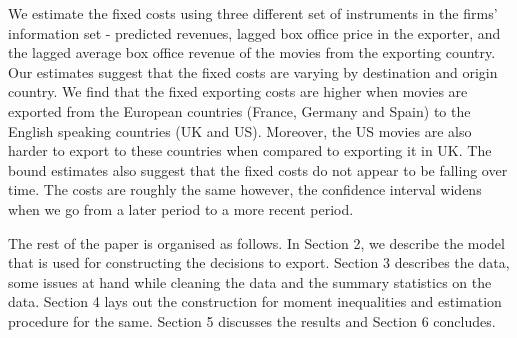 \documentclass[11pt, letterpaper]{article} \usepackage{amsmath}
\begin{document}
We estimate the fixed costs using three different set of instruments
in the firms' information set - predicted revenues, lagged box office
price in the exporter, and the lagged average box office revenue of
the movies from the exporting country. Our estimates suggest that the
fixed costs are varying by destination and origin country. We find
that the fixed exporting costs are higher when movies are exported
from the European countries (France, Germany and Spain) to the English
speaking countries (UK and US). Moreover, the US movies are also
harder to export to these countries when compared to exporting it in
UK. The bound estimates also suggest that the fixed costs do not
appear to be falling over time. The costs are roughly the same
however, the confidence interval widens when we go from a later period
to a more recent period.

The rest of the paper is organised as follows. In Section 2, we
describe the model that is used for constructing the decisions to
export. Section 3 describes the data, some issues at hand while
cleaning the data and the summary statistics on the data. Section 4
lays out the construction for moment inequalities and estimation
procedure for the same. Section 5 discusses the results and Section 6
concludes.
\end{document}
